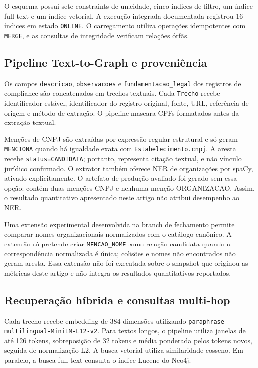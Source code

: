 \documentclass[12pt]{article}
\begin{document}
O esquema possui sete constraints de unicidade, cinco índices de filtro, um índice full-text e um índice vetorial. A execução integrada documentada registrou 16 índices em estado \texttt{ONLINE}. O carregamento utiliza operações idempotentes com \texttt{MERGE}, e as consultas de integridade verificam relações órfãs.

\subsection{Pipeline Text-to-Graph e proveniência}

Os campos \texttt{descricao}, \texttt{observacoes} e \texttt{fundamentacao\_legal} dos registros de compliance são concatenados em trechos textuais. Cada \texttt{Trecho} recebe identificador estável, identificador do registro original, fonte, URL, referência de origem e método de extração. O pipeline mascara CPFs formatados antes da extração textual.

Menções de CNPJ são extraídas por expressão regular estrutural e só geram \texttt{MENCIONA} quando há igualdade exata com \texttt{Estabelecimento.cnpj}. A aresta recebe \texttt{status=CANDIDATA}; portanto, representa citação textual, e não vínculo jurídico confirmado. O extrator também oferece NER de organizações por spaCy, ativado explicitamente. O artefato de produção avaliado foi gerado sem essa opção: contém duas menções CNPJ e nenhuma menção ORGANIZACAO. Assim, o resultado quantitativo apresentado neste artigo não atribui desempenho ao NER.

Uma extensão experimental desenvolvida na branch de fechamento permite comparar nomes organizacionais normalizados com o catálogo canônico. A extensão só pretende criar \texttt{MENCAO\_NOME} como relação candidata quando a correspondência normalizada é única; colisões e nomes não encontrados não geram aresta. Essa extensão não foi executada sobre o snapshot que originou as métricas deste artigo e não integra os resultados quantitativos reportados.

\subsection{Recuperação híbrida e consultas multi-hop}

Cada trecho recebe embedding de 384 dimensões utilizando \texttt{paraphrase-multilingual-MiniLM-L12-v2}. Para textos longos, o pipeline utiliza janelas de até 126 tokens, sobreposição de 32 tokens e média ponderada pelos tokens novos, seguida de normalização L2. A busca vetorial utiliza similaridade cosseno. Em paralelo, a busca full-text consulta o índice Lucene do Neo4j.
\end{document}
